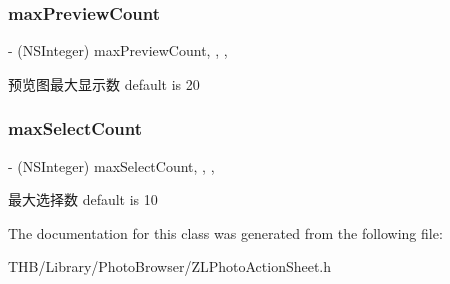 \subsubsection{\texorpdfstring{max\+Preview\+Count}{maxPreviewCount}}
{\footnotesize\ttfamily -\/ (N\+S\+Integer) max\+Preview\+Count\hspace{0.3cm}{\ttfamily [read]}, {\ttfamily [write]}, {\ttfamily [nonatomic]}, {\ttfamily [assign]}}

预览图最大显示数 default is 20 \mbox{\label{interface_z_l_photo_action_sheet_a63de056ef141d8fc4af1975d7002532e}} 
\subsubsection{\texorpdfstring{max\+Select\+Count}{maxSelectCount}}
{\footnotesize\ttfamily -\/ (N\+S\+Integer) max\+Select\+Count\hspace{0.3cm}{\ttfamily [read]}, {\ttfamily [write]}, {\ttfamily [nonatomic]}, {\ttfamily [assign]}}

最大选择数 default is 10 

The documentation for this class was generated from the following file\+:\begin{DoxyCompactItemize}
\item 
T\+H\+B/\+Library/\+Photo\+Browser/Z\+L\+Photo\+Action\+Sheet.\+h\end{DoxyCompactItemize}
